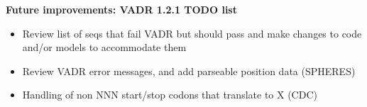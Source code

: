\documentclass[landscape]{slides}
\begin{document}
%
%
\begin{slide}
\begin{center}
\Large{\textbf{Future improvements: VADR 1.2.1 TODO list}}

\small
\begin{itemize}
\item Review list of seqs that fail VADR but should pass and make changes to code and/or models to accommodate them
\item Review VADR error messages, and add parseable position data (SPHERES)
\item Handling of non NNN start/stop codons that translate to X (CDC)
\end{itemize}

\end{center}

\vfill
\end{slide}
\end{document}
